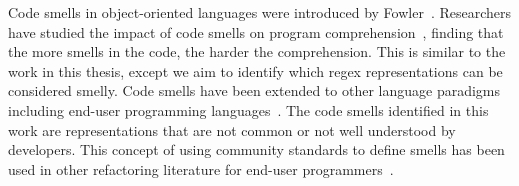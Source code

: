 Code smells in object-oriented languages were introduced by Fowler~\cite{Fowl1999}. Researchers have studied the impact of code smells on program comprehension~\cite{abbes2011empirical, du2006does}, finding that the more smells in the code, the harder the comprehension. This is similar to the work in this thesis, except we aim to identify which  regex representations can be considered smelly.
Code smells have been extended to other language paradigms including end-user programming languages~\cite{Hermans2012intra, Hermans2012intraExt, stoleeicse, stoleeTSE}. The code smells identified in this work are representations that are not common or not well understood by developers. This concept of using community standards to define smells has been used in other refactoring literature  for end-user programmers~\cite{stoleeicse, stoleeTSE}.
